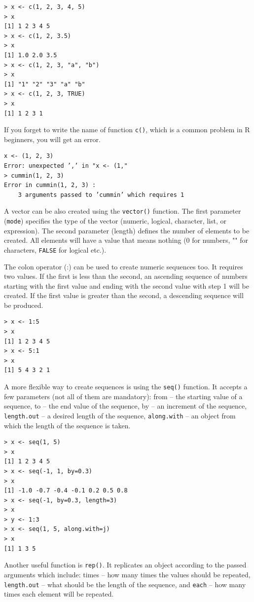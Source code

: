 \begin{verbatim}
> x <- c(1, 2, 3, 4, 5)
> x
[1] 1 2 3 4 5
> x <- c(1, 2, 3.5)
> x
[1] 1.0 2.0 3.5
> x <- c(1, 2, 3, "a", "b")
> x
[1] "1" "2" "3" "a" "b"
> x <- c(1, 2, 3, TRUE)
> x
[1] 1 2 3 1
\end{verbatim}

If you forget to write the name of function \texttt{c()}, which is a common problem
in R beginners, you will get an error.

\begin{verbatim}
x <- (1, 2, 3)
Error: unexpected ’,’ in "x <- (1,"
> cummin(1, 2, 3)
Error in cummin(1, 2, 3) :
    3 arguments passed to ’cummin’ which requires 1
\end{verbatim}

A vector can be also created using the \texttt{vector()} function. The first parameter (\texttt{mode}) specifies the type of the vector (numeric, logical, character, list, or
expression). The second parameter (length) defines the number of elements to
be created. All elements will have a value that means nothing (0 for numbers, ""
for characters, \texttt{FALSE} for logical etc.).

The colon operator (:) can be used to create numeric sequences too. It requires two values. If the first is less than the second, an ascending sequence of
numbers starting with the first value and ending with the second value with step 1
will be created. If the first value is greater than the second, a descending sequence
will be produced.

\begin{verbatim}
> x <- 1:5
> x
[1] 1 2 3 4 5
> x <- 5:1
> x
[1] 5 4 3 2 1
\end{verbatim}

A more flexible way to create sequences is using the \texttt{seq()} function. It accepts a few parameters (not all of them are mandatory): from – the starting value
of a sequence, to – the end value of the sequence, by – an increment of the
sequence, \texttt{length.out} – a desired length of the sequence, \texttt{along.with} – an
object from which the length of the sequence is taken.

\begin{verbatim}
> x <- seq(1, 5)
> x
[1] 1 2 3 4 5
> x <- seq(-1, 1, by=0.3)
> x
[1] -1.0 -0.7 -0.4 -0.1 0.2 0.5 0.8
> x <- seq(-1, by=0.3, length=3)
> x
> y <- 1:3
> x <- seq(1, 5, along.with=j)
> x
[1] 1 3 5
\end{verbatim}

Another useful function is \texttt{rep()}. It replicates an object according to the
passed arguments which include: times – how many times the values should be
repeated, \texttt{length.out} – what should be the length of the sequence, and \texttt{each} –
how many times each element will be repeated.

